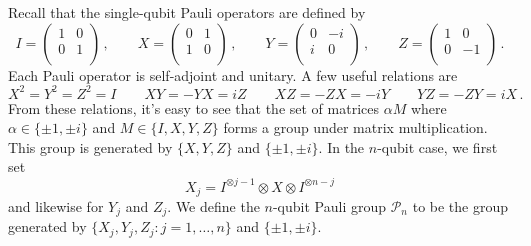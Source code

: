 \documentclass[11pt]{article}
\numberwithin{equation}{section}
\begin{document}
{Recall that the single-qubit Pauli operators are defined by
$$
I =
\begin{pmatrix} 
1 & 0 \\
0 & 1 \\
\end{pmatrix}\,,
\qquad
X =
\begin{pmatrix} 
0 & 1 \\
1 & 0 \\
\end{pmatrix}\,,
\qquad
Y =
\begin{pmatrix} 
0 & -i \\
i & 0 \\
\end{pmatrix}\,,
\qquad
Z = 
\begin{pmatrix} 
1 & 0 \\
0 & -1 \\
\end{pmatrix}\,.
$$
Each Pauli operator is self-adjoint and unitary. A few useful relations are
$$
X^2 = Y^2 = Z^2 = I
\qquad
XY = -YX = iZ
\qquad
XZ = -ZX = -iY
\qquad 
YZ = -ZY = iX\,.
$$
From these relations, it's easy to see that the set of matrices $\alpha M$ where $\alpha \in \{\pm 1, \pm i\}$ and $M \in \{I, X, Y, Z\}$ forms a group under matrix multiplication. This group is generated by $\{X, Y, Z\}$ and $\{\pm 1, \pm  i\}$. In the $n$-qubit case, we first set
$$
X_j = I^{\otimes j-1} \otimes X \otimes I^{\otimes n-j}
$$
and likewise for $Y_j$ and $Z_j$. We define the $n$-qubit Pauli group $\mathcal P_n$ to be the group generated by $\{X_j, Y_j, Z_j : j = 1, \dots, n \}$  and $\{\pm 1, \pm i\}$.

}
\end{document}
